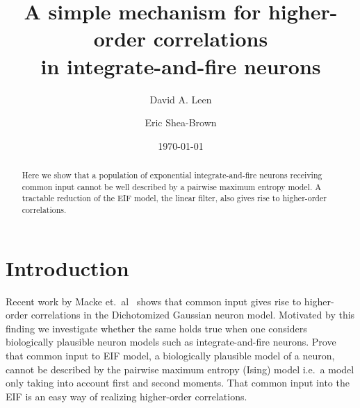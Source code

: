 \documentclass[%
 reprint,
 amsmath,amssymb,
 aps,
floatfix,
]{revtex4-1}
\begin{document}

\title{A simple mechanism for higher-order correlations\\ in integrate-and-fire neurons}%

\author{David A. Leen}

 
\author{Eric Shea-Brown}%

\date{\today}%

\begin{abstract}
Here we show that a population of exponential integrate-and-fire neurons receiving common input cannot be well described by a pairwise maximum entropy model. A tractable reduction of the EIF model, the linear filter, also gives rise to higher-order correlations. 
\end{abstract}

\maketitle

\section{\label{sec:intro}Introduction}%
Recent work by Macke et.~al~\cite{Macke:2011gw} shows that common input gives rise to higher-order correlations in the Dichotomized Gaussian neuron model. Motivated by this finding we investigate whether the same holds true when one considers biologically plausible neuron models such as integrate-and-fire neurons. Prove that common input to EIF model, a biologically plausible model of a neuron, cannot be described by the pairwise maximum entropy (Ising) model i.e.~a model only taking into account first and second moments. That common input into the EIF is an easy way of realizing higher-order correlations.
\end{document}
